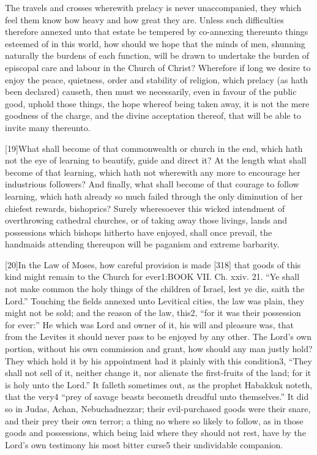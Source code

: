 The travels and crosses wherewith prelacy is never unaccompanied, they which feel them know how heavy and how great they are. Unless such difficulties therefore annexed unto that estate be tempered by co-annexing thereunto things esteemed of in this world, how should we hope that the minds of men, shunning naturally the burdens of each function, will be drawn to undertake the burden of episcopal care and labour in the Church of Christ? Wherefore if long we desire to enjoy the peace, quietness, order and stability of religion, which prelacy (as hath been declared) causeth, then must we necessarily, even in favour of the public good, uphold those things, the hope whereof being taken away, it is not the mere goodness of the charge, and the divine acceptation thereof, that will be able to invite many thereunto.

[19]What shall become of that commonwealth or church in the end, which hath not the eye of learning to beautify, guide and direct it? At the length what shall become of that learning, which hath not wherewith any more to encourage her industrious followers? And finally, what shall become of that courage to follow learning, which hath already so much failed through the only diminution of her chiefest rewards, bishoprics? Surely wheresoever this wicked intendment of overthrowing cathedral churches, or of taking away those livings, lands and possessions which bishops hitherto have enjoyed, shall once prevail, the handmaids attending thereupon will be paganism and extreme barbarity.

[20]In the Law of Moses, how careful provision is made [318] that goods of this kind might remain to the Church for ever1:BOOK VII. Ch. xxiv. 21. “Ye shall not make common the holy things of the children of Israel, lest ye die, saith the Lord.” Touching the fields annexed unto Levitical cities, the law was plain, they might not be sold; and the reason of the law, this2, “for it was their possession for ever:” He which was Lord and owner of it, his will and pleasure was, that from the Levites it should never pass to be enjoyed by any other. The Lord’s own portion, without his own commission and grant, how should any man justly hold? They which hold it by his appointment had it plainly with this condition3, “They shall not sell of it, neither change it, nor alienate the first-fruits of the land; for it is holy unto the Lord.” It falleth sometimes out, as the prophet Habakkuk noteth, that the very4 “prey of savage beasts becometh dreadful unto themselves.” It did so in Judas, Achan, Nebuchadnezzar; their evil-purchased goods were their snare, and their prey their own terror; a thing no where so likely to follow, as in those goods and possessions, which being laid where they should not rest, have by the Lord’s own testimony his most bitter curse5 their undividable companion.

